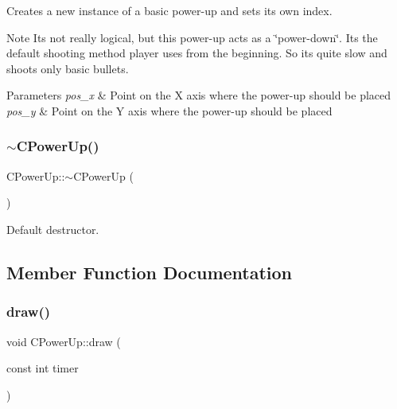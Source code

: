 Creates a new instance of a basic power-\/up and sets it\textquotesingle{}s own index.

\begin{DoxyNote}{Note}
It\textquotesingle{}s not really logical, but this power-\/up acts as a \char`\"{}power-\/down\char`\"{}. It\textquotesingle{}s the default shooting method player uses from the beginning. So it\textquotesingle{}s quite slow and shoots only basic bullets.
\end{DoxyNote}

\begin{DoxyParams}{Parameters}
{\em pos\+\_\+x} & Point on the X axis where the power-\/up should be placed \\
\hline
{\em pos\+\_\+y} & Point on the Y axis where the power-\/up should be placed \\
\hline
\end{DoxyParams}
\mbox{\label{classCPowerUp_a7c76b245e1c5969add6f8721587817a3}} 
\subsubsection{\texorpdfstring{$\sim$\+C\+Power\+Up()}{~CPowerUp()}}
{\footnotesize\ttfamily C\+Power\+Up\+::$\sim$\+C\+Power\+Up (\begin{DoxyParamCaption}{ }\end{DoxyParamCaption})\hspace{0.3cm}{\ttfamily [virtual]}}



Default destructor. 



\subsection{Member Function Documentation}
\mbox{\label{classCPowerUp_af1e0bad769efcde21858144596212e01}} 
\subsubsection{\texorpdfstring{draw()}{draw()}}
{\footnotesize\ttfamily void C\+Power\+Up\+::draw (\begin{DoxyParamCaption}\item[{const int}]{timer }\end{DoxyParamCaption})\hspace{0.3cm}{\ttfamily [virtual]}}

